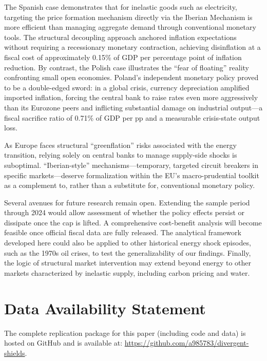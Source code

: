 \documentclass[12pt, a4paper]{article}
\begin{document}
The Spanish case demonstrates that for inelastic goods such as electricity, targeting the price formation mechanism directly via the Iberian Mechanism is more efficient than managing aggregate demand through conventional monetary tools. The structural decoupling approach anchored inflation expectations without requiring a recessionary monetary contraction, achieving disinflation at a fiscal cost of approximately 0.15\% of GDP per percentage point of inflation reduction. By contrast, the Polish case illustrates the ``fear of floating'' reality confronting small open economies. Poland's independent monetary policy proved to be a double-edged sword: in a global crisis, currency depreciation amplified imported inflation, forcing the central bank to raise rates even more aggressively than its Eurozone peers and inflicting substantial damage on industrial output---a fiscal sacrifice ratio of 0.71\% of GDP per pp and a measurable crisis-state output loss.

As Europe faces structural ``greenflation'' risks associated with the energy transition, relying solely on central banks to manage supply-side shocks is suboptimal. ``Iberian-style'' mechanisms---temporary, targeted circuit breakers in specific markets---deserve formalization within the EU's macro-prudential toolkit as a complement to, rather than a substitute for, conventional monetary policy.

Several avenues for future research remain open. Extending the sample period through 2024 would allow assessment of whether the policy effects persist or dissipate once the cap is lifted. A comprehensive cost-benefit analysis will become feasible once official fiscal data are fully released. The analytical framework developed here could also be applied to other historical energy shock episodes, such as the 1970s oil crises, to test the generalizability of our findings. Finally, the logic of structural market intervention may extend beyond energy to other markets characterized by inelastic supply, including carbon pricing and water.


\section*{Data Availability Statement}

The complete replication package for this paper (including code and data) is hosted on GitHub and is available at: \url{https://github.com/a985783/divergent-shields}.


\end{document}
